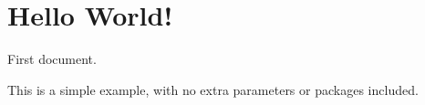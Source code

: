 \documentclass[12pt]{article}
\begin{document}
\thispagestyle{empty}
\vspace*{2in}
\section*{\LARGE Hello World!}
\begin{flushleft}
  { \large
    First document.
    
    This is a simple example, with no
    extra parameters or packages included.
  }
\end{flushleft}
\end{document}
